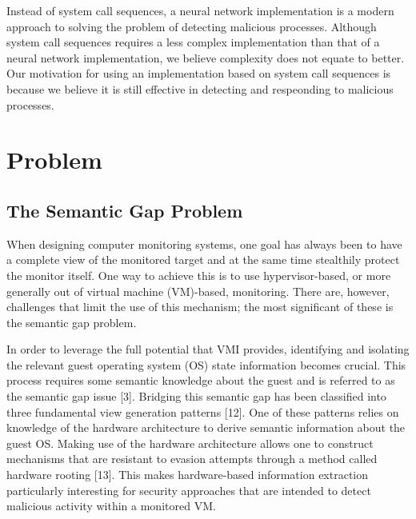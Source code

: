 \documentclass{report}
\begin{document}
\begin{spacing}{1.5}
Instead of system call sequences, a neural network implementation is a modern
approach to solving the problem of detecting malicious processes. Although system
call sequences requires a less complex implementation than that of a neural network
implementation, we believe complexity does not equate to better. Our motivation for
using an implementation based on system call sequences is because we believe it is
still effective in detecting and respeonding to malicious processes.

















\section{Problem}
\subsection{The Semantic Gap Problem}
When designing computer monitoring systems, one goal has always been to have a complete view of the
monitored target and at the same time stealthily protect the monitor itself. One way to achieve this is to
use hypervisor-based, or more generally out of virtual machine (VM)-based, monitoring. There are, however,
challenges that limit the use of this mechanism; the most significant of these is the semantic gap problem.



In order to leverage the full potential that VMI provides, identifying and
isolating the relevant guest operating system (OS) state information becomes
crucial. This process requires some semantic knowledge about the guest and is
referred to as the semantic gap issue [3]. Bridging this semantic gap has been
classified into three fundamental view generation patterns [12]. One of these
patterns relies on knowledge of the hardware architecture to derive semantic
information about the guest OS. Making use of the hardware architecture allows
one to construct mechanisms that are resistant to evasion attempts through a
method called hardware rooting [13]. This makes hardware-based information
extraction particularly interesting for security approaches that are intended to
detect malicious activity within a monitored VM.
















\end{spacing}
\end{document}
